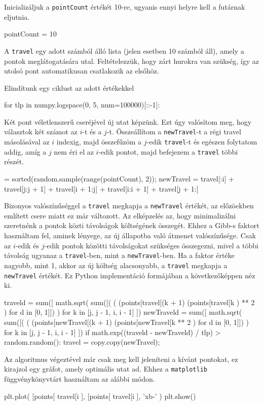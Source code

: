 Inicializáljuk a \texttt{pointCount} értékét 10-re, ugyanis ennyi helyre kell a futárnak eljutnia.
\begin{python}
pointCount = 10
\end{python}
A \texttt{travel} egy adott számból álló lista (jelen esetben 10 számból áll), amely a pontok meglátogatására utal. Feltételezzük, hogy zárt hurokra van szükség, így az utolsó pont automatikusan csatlakozik az elsőhöz.
\begin{python}
travel = random.sample(range(pointCount), pointCount);}
\end{python}
Elindítunk egy ciklust az adott értékekkel
\begin{python}
for tlp in numpy.logspace(0, 5, num=100000)[::-1]:
\end{python}
Két pont véletlenszerű cseréjével új utat képzünk. Ezt úgy valósítom meg, hogy választok két számot az $i$-t és a $j$-t. Összeállítom a \texttt{newTravel}-t a régi travel másolásával az $i$ indexig, majd összefűzöm a $j$-edik \texttt{travel}-t és egészen folytatom addig, amíg a $j$ nem éri el az $i$-edik pontot, majd befejezem a \texttt{travel} többi részét.
\begin{python}
[i, j] = sorted(random.sample(range(pointCount), 2));
newTravel = travel[:i] + 
			travel[j:j + 1] + 
			travel[i + 1:j] + 
			travel[i:i + 1] + 
			travel[j + 1:]
\end{python}

Bizonyos valószínűséggel a \texttt{travel} megkapja a \texttt{newTravel} értékét, az előzöekben említett csere miatt ez már változott. Az elképzelés az, hogy minimalizálni szeretnénk a pontok közti távolságok költségének összegét. Ehhez a Gibb-s faktort használtam fel, aminek lényege, az új állapotba való átmenet valószínűsége. Csak az $i$-edik és $j$-edik pontok közötti távolságokat szükséges összegezni, mivel a többi távolság ugyanaz a \texttt{travel}-ben, mint a \texttt{newTravel}-ben. Ha a faktor értéke nagyobb, mint 1, akkor az új költség alacsonyabb, a \texttt{travel} megkapja a \texttt{newTravel} értékét.
Ez Python implementáció formájában a következőképpen néz ki.
\begin{python}
traveld = sum([
	math.sqrt(
		sum([(
			(
			  (points[travel[(k + 1) %
			  (points[travel[k %
			) **  2
		) for d in [0, 1]])
	) for k in [j, j - 1, i, i - 1]
])
newTraveld = sum([
	math.sqrt(
		sum([(
			(
			  (points[newTravel[(k + 1) %
			  (points[newTravel[k %
			** 2
		) for d in [0, 1]])
	) for k in [j, j - 1, i, i - 1]
])
if math.exp((traveld - newTraveld) / tlp) > random.random():
    travel = copy.copy(newTravel);
\end{python}
Az algoritmus végeztével már csak meg kell jeleníteni a kívánt pontokat, ez kirajzol egy gráfot, amely optimális utat ad. Ehhez a \texttt{matplotlib} függvénykönyvtárt használtam az alábbi módon.
\begin{python}
plt.plot(
	[points[
		travel[i %
	], 
	[points[
		travel[i %
	], 
	'xb-'
)
plt.show()
\end{python}


